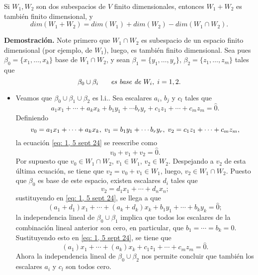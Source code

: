 \begin{teo}
Si $W_{1}, W_{2}$ son dos subespacios de $V$ finito dimensionales,
entonces $W_{1} + W_{2}$ es también finito dimensional, y 
\[
dim(W_{1} + W_{2}) = dim(W_{1}) + dim(W_{2}) - dim(W_{1} \cap W_{2}).
\]
\end{teo}
\noindent
\textbf{Demostración.}
Note primero que $W_{1} \cap W_{2}$ es subespacio de un espacio
finito dimensional (por ejemplo, de $W_{1}$), luego, es también
finito dimensional. Sea pues
$\beta_{0} = \{ x_{1}, \ldots , x_{k} \}$ base de 
$W_{1} \cap W_{2}$, y sean 
$\beta_{1} = \{ y_{1}, \ldots , y_{r} \}$, 
$\beta_{2} = \{ z_{1}, \ldots , z_{m} \}$
tales que
\[
\beta_{0} \cup \beta_{i} \hspace{0.5cm}
\textit{ es base de } W_{i}, \hspace{0.1cm} i = 1,2.
\] 
\begin{itemize}
	\item Veamos que $\beta_{0} \cup \beta_{1} \cup \beta_{2}$
	es l.i.. Sea escalares $a_{i}$, $b_{j}$ y $c_{l}$ tales que 
	\begin{equation}
		\label{eq: 1, 5 sept 24}
		a_{1}x_{1} + \cdots + a_{k} x_{k} + 
		b_{1}y_{1} + \cdots b_{r}y_{r} +
		c_{1}z_{1} + \cdots + c_{m}z_{m} = \hat{0}.
	\end{equation}
	Definiendo
	\[
	v_{0} = a_{1}x_{1} + \cdots + a_{k} x_{k},
	\hspace{0.1cm}
	v_{1} = b_{1}y_{1} + \cdots b_{r}y_{r},
	\hspace{0.1cm}
	v_{2} = c_{1}z_{1} + \cdots + c_{m}z_{m},
	\]
	la ecuación \eqref{eq: 1, 5 sept 24}
	se reescribe como
	\[
	v_{0} + v_{1} + v_{2} = \hat{0}.
	\]
	Por supuesto que $v_{0} \in W_{1} \cap W_{2}$,
	$v_{1}  \in W_{1}$, $v_{2} \in W_{2}$.
	Despejando a $v_{2}$ de esta última ecuación, se tiene que
	$v_{2} = v_{0} + v_{1} \in W_{1}$, luego,
	$v_{2} \in W_{1} \cap W_{2}$.
	Puesto que $\beta_{0}$ es base de este espacio, existen
	escalares $d_{i}$ tales que 
	\begin{equation}
		\label{eq: 2, 5 sept 24}
		v_{2} = d_{1}x_{1} + \cdots + d_{n} x_{n};
	\end{equation}
	sustituyendo en \eqref{eq: 1, 5 sept 24}, se llega a que
	\[
	(a_{1}+d_{1})x_{1} + \cdots + (a_{k}+d_{k})x_{k} +
	b_{1}y_{1} + \cdots + b_{k}y_{k} = \hat{0};
	\]
	la independencia lineal de $\beta_{0}\cup \beta_{1}$
	implica que todos los escalares de la combinación lineal
	anterior son cero, en particular, que 
	$b_{1} = \cdots = b_{k} = 0$. Sustituyendo esto en 
	\eqref{eq: 1, 5 sept 24}, se tiene que 
	\[
	(a_{1})x_{1} + \cdots + (a_{k})x_{k} +
	c_{1}z_{1} + \cdots + c_{m}z_{m} = \hat{0}.
	\]
	Ahora la independencia lineal de $\beta_{0} \cup \beta_{2}$
	nos permite concluir que también los escalares $a_{i}$ y
	$c_{l}$ son todos cero.
	

\end{itemize}
